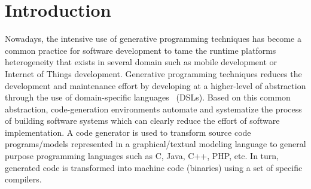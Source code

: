 \section{Introduction}
Nowadays, the intensive use of generative programming techniques has become a common practice for software development to tame the runtime platforms heterogeneity that exists in several domain such as mobile development or Internet of Things development.  Generative programming techniques reduces the development and maintenance effort by developing at a higher-level of abstraction through the use of domain-specific languages~\cite{brambilla2012model} (DSLs). 
Based on this common abstraction, code-generation environments automate and systematize the process of building software systems which can clearly reduce the effort of software implementation.
A code generator is used to transform source code programs/models represented in a graphical/textual modeling language to general purpose programming languages such as C, Java, C++, PHP, etc. In turn, generated code is transformed into machine code (binaries) using a set of specific compilers.


